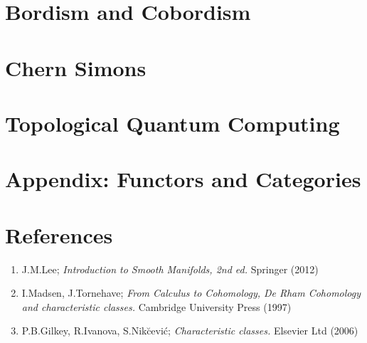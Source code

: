 \documentclass[a4paper]{article}
\theoremstyle{definition} \newtheorem*{definition}{Definition}
\theoremstyle{definition} \newtheorem*{definitions}{Definitions}
\theoremstyle{plain} \newtheorem{theorem}{Theorem}[section]
\theoremstyle{plain} \newtheorem{proposition}[theorem]{Proposition}
\theoremstyle{plain} \newtheorem{corollary}[theorem]{Corollary}
\theoremstyle{plain} \newtheorem{lemma}[theorem]{Lemma}
\theoremstyle{plain} \newtheorem{example}[theorem]{Example}
\begin{document}
\section{Bordism and Cobordism}

\section{Chern Simons}

\section{Topological Quantum Computing}

\section{Appendix: Functors and Categories}

\section*{References}
\begin{enumerate}
\item J.M.Lee; \textit{Introduction to Smooth Manifolds, 2nd ed.} Springer (2012)
\item I.Madsen, J.Tornehave; \textit{From Calculus to Cohomology, De Rham Cohomology and characteristic classes.} Cambridge University Press (1997)
\item P.B.Gilkey, R.Ivanova, S.Nik{\u c}evi\'c; \textit{Characteristic classes.} Elsevier Ltd (2006)
\end{enumerate}
\end{document}
